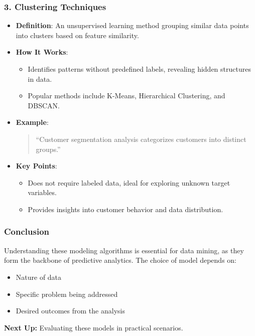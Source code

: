 \documentclass[aspectratio=169]{beamer}
\begin{document}
\begin{frame}[fragile]
    \frametitle{3. Clustering Techniques}
    \begin{itemize}
        \item \textbf{Definition}: An unsupervised learning method grouping similar data points into clusters based on feature similarity.
        \item \textbf{How It Works}:
        \begin{itemize}
            \item Identifies patterns without predefined labels, revealing hidden structures in data.
            \item Popular methods include K-Means, Hierarchical Clustering, and DBSCAN.
        \end{itemize}
        \item \textbf{Example}:
            \begin{quote}
                ``Customer segmentation analysis categorizes customers into distinct groups.''
            \end{quote}
        \item \textbf{Key Points}:
        \begin{itemize}
            \item Does not require labeled data, ideal for exploring unknown target variables.
            \item Provides insights into customer behavior and data distribution.
        \end{itemize}
    \end{itemize}
\end{frame}

\begin{frame}[fragile]
    \frametitle{Conclusion}
    Understanding these modeling algorithms is essential for data mining, as they form the backbone of predictive analytics. The choice of model depends on:
    \begin{itemize}
        \item Nature of data
        \item Specific problem being addressed
        \item Desired outcomes from the analysis
    \end{itemize}
    \vfill
    \textbf{Next Up:} Evaluating these models in practical scenarios.
\end{frame}
\end{document}

